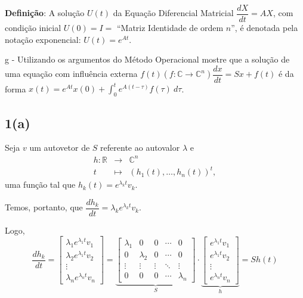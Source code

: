\begin{description}
\textbf{Definição}: A solução $U(t)$ da Equação Diferencial Matricial $\dfrac{dX}{dt} = AX$, com condição inicial $U(0) = I =$ ``Matriz Identidade de ordem $n$'', é denotada pela notação exponencial: $U(t) = e^{A t}$.

\item g  -  Utilizando os argumentos do Método Operacional mostre que a solução de uma equação com influência externa $f(t) (f: \mathbb{C} \to \mathbb{C}^n) \dfrac{dx}{dt} = Sx + f(t)$ é da forma $x(t) = e^{A t} x(0) + \displaystyle\int_{0}^{t} e^{A(t-\tau)} f(\tau)\ d\tau$.
\end{description}






\subsection*{1(a)}

Seja \(v\) um autovetor de \(S\) referente ao autovalor \(\lambda\) e
\[\begin{array}{rcl}
h: \mathbb{R} &\to& \mathbb{C}^n \\
t &\mapsto& (h_1(t), \ldots, h_n(t))^t,
\end{array}\]
uma função tal que \(h_k(t) = e^{\lambda_k t} v_k\).

Temos, portanto, que \(\dfrac{dh_k}{dt} = \lambda_k e^{\lambda_k t} v_k\).

Logo,
\[
\dfrac{dh_k}{dt}
= 
\left[\begin{array}{c}
\lambda_1 e^{\lambda_1 t} v_1  \\
\lambda_2 e^{\lambda_1 t} v_2  \\
\vdots \\
\lambda_n e^{\lambda_n t} v_n
\end{array}\right]
=
\underbrace{\left[\begin{array}{ccccc}
\lambda_1 & 0 & 0 & \cdots & 0 \\
0 & \lambda_2 & 0 & \cdots & 0 \\
\vdots & \vdots & \vdots & \ddots & \vdots \\
0 & 0 & 0 & \cdots & \lambda_n 
\end{array}\right]}_{S}
\cdot
\underbrace{\left[\begin{array}{c}
e^{\lambda_1 t} v_1  \\
e^{\lambda_1 t} v_2  \\
\vdots \\
e^{\lambda_n t} v_n
\end{array}\right]}_{h}
= S h(t)
\]

